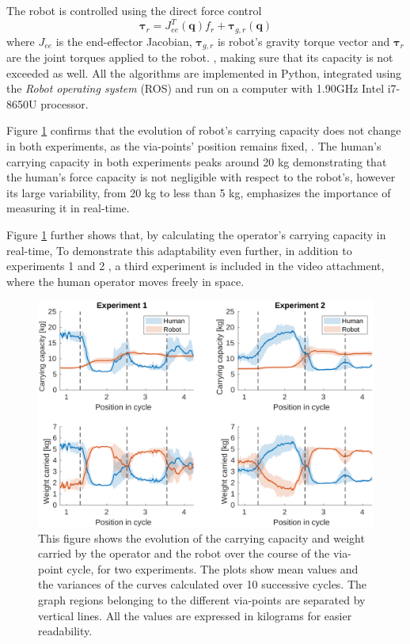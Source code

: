 The robot is controlled using the direct force control
$$
\bm{\tau}_r = J_{ee}^T(\bm{q}) f_r + \bm{\tau}_{g,r}(\bm{q})
$$
where $J_{ee}$ is the end-effector Jacobian, $\bm{\tau}_{g,r}$ is robot's gravity torque vector and $\bm{\tau}_r$ are the joint torques applied to the robot. 
 \cite{skuric:hal-02993408}, making sure that its capacity is not exceeded as well. All the algorithms are implemented in Python, integrated using the \textit{Robot operating system} (ROS) and run on a computer with 1.90GHz Intel i7-8650U processor. 

Figure \ref{fig:experiment_results} confirms that the evolution of robot's carrying capacity does not change in both experiments, as the via-points' position remains fixed, . The human's carrying capacity in both experiments peaks around 20 kg demonstrating that the human's force capacity is not negligible with respect to the robot's, however its large variability, from 20 kg to less than 5 kg, emphasizes the importance of measuring it in real-time.    

Figure \ref{fig:experiment_results} further shows that, by calculating the operator's carrying capacity in real-time, 
To demonstrate this adaptability even further, in addition to  experiments 1 and 2 , a third experiment is included in the video attachment, where the human operator moves freely in space. 

\begin{figure}[!t]
    \centering
    \includegraphics[width=\linewidth]{Papers/images/experiments.pdf}
    \caption{This figure shows the evolution of the carrying capacity and weight carried by the operator and the robot over the course of the via-point cycle, for two experiments. The plots show mean values and the variances of the curves calculated over 10 successive cycles. The graph regions belonging to the different via-points are separated by vertical lines.  All the values are expressed in kilograms for easier readability.}
    \label{fig:experiment_results}
\end{figure}
